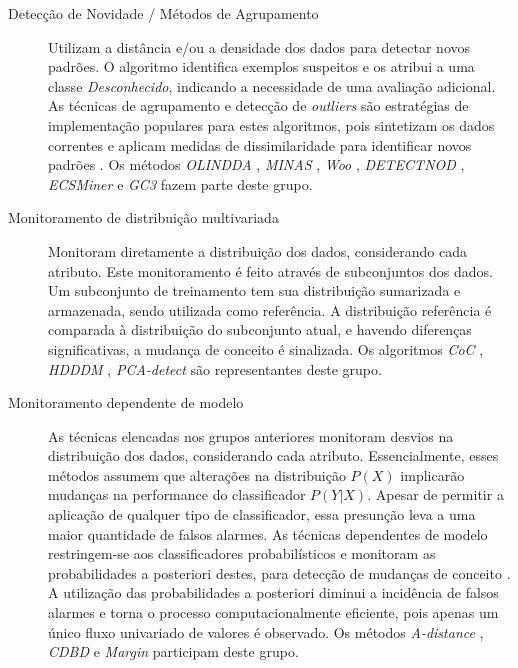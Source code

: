 \documentclass[qual, classic, a4paper]{ufbathesis}
\begin{document}
\begin{description}
    \item[Detecção de Novidade / Métodos de Agrupamento] 
    Utilizam a distância e/ou a densidade dos dados para detectar novos padrões.
    O algoritmo identifica exemplos suspeitos e os atribui a uma classe \textit{Desconhecido}, indicando a necessidade de uma avaliação adicional.
    As técnicas de agrupamento e detecção de \textit{outliers} são estratégias de implementação populares para estes algoritmos, 
    pois sintetizam os dados correntes e aplicam medidas de dissimilaridade para identificar novos padrões \cite{Ryu:Kantardzic:2012}.
    Os métodos 
    \textit{OLINDDA} \cite{Spinosa:2007:OCA:1244002.1244107},
    \textit{MINAS} \cite{Faria:2013:NDA:2480362.2480515},
    \textit{Woo} \cite{Ryu:Kantardzic:2012},
    \textit{DETECTNOD} \cite{Hashemi:Hayat:DETECTNOD:2010},
    \textit{ECSMiner} \cite{Masud:2011:CNC:1978259.1978529} e
    \textit{GC3} \cite{Sethi2016b:GC3} fazem parte deste grupo.
    
    \item[Monitoramento de distribuição multivariada]
    Monitoram diretamente a distribuição dos dados, considerando cada atributo.
    Este monitoramento é feito através de subconjuntos dos dados.
    Um subconjunto de treinamento tem sua distribuição sumarizada e armazenada, sendo utilizada como referência.
    A distribuição referência é comparada à distribuição do subconjunto atual, e havendo diferenças significativas, a mudança de conceito é sinalizada.
    Os algoritmos
    \textit{CoC} \cite{Lee:Magoules:CoC:2012},
    \textit{HDDDM} \cite{Ditzler:Polikar:HDDDM:2011},
    \textit{PCA-detect} \cite{Kuncheva:PCADetect:20085}
    são representantes deste grupo.

    \item[Monitoramento dependente de modelo]
    As técnicas elencadas nos grupos anteriores monitoram desvios na distribuição dos dados, considerando cada atributo.
    Essencialmente, esses métodos assumem que alterações na distribuição $P(X)$ implicarão mudanças na performance do classificador $P(Y|X)$.
    Apesar de permitir a aplicação de qualquer tipo de classificador, essa presunção leva a uma maior quantidade de falsos alarmes.
    As técnicas dependentes de modelo restringem-se aos classificadores probabilísticos e monitoram as probabilidades a posteriori destes, 
    para detecção de mudanças de conceito \cite{Zliobaite:2010}.
    A utilização das probabilidades a posteriori diminui a incidência de falsos alarmes e torna o processo computacionalmente eficiente, 
    pois apenas um único fluxo univariado de valores é observado.
    Os métodos 
    \textit{A-distance} \cite{Dredze:ADistance:2010585},
    \textit{CDBD} \cite{Lindstrom:CDBD:2013} e
    \textit{Margin} \cite{Dries:Margin:2009} participam deste grupo.
\end{description}
\end{document}

